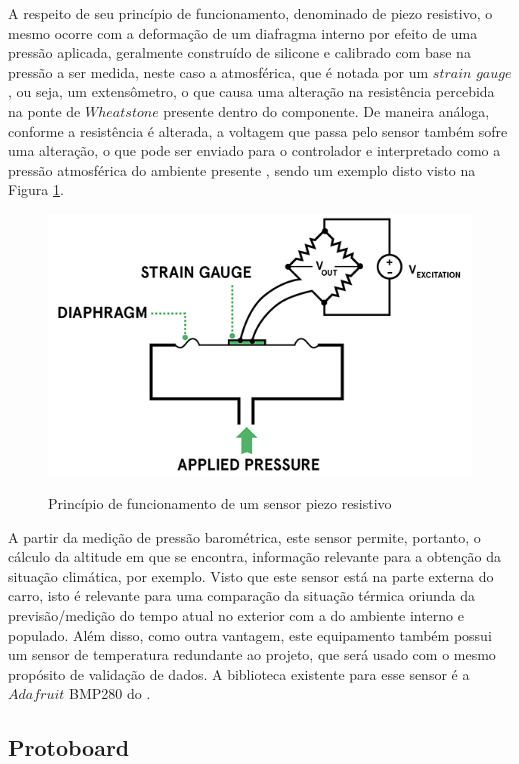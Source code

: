 \documentclass[acronym,symbols]{fei}
\begin{document}
A respeito de seu princípio de funcionamento, denominado de piezo resistivo, o mesmo ocorre com a deformação de um diafragma interno por efeito de uma pressão aplicada, geralmente construído de silicone e calibrado com base na pressão a ser medida, neste caso a atmosférica, que é notada por um $strain$ $gauge$, ou seja, um extensômetro, o que causa uma alteração na resistência percebida na ponte de $Wheatstone$ presente dentro do componente. De maneira análoga, conforme a resistência é alterada, a voltagem que passa pelo sensor também sofre uma alteração, o que pode ser enviado para o controlador e interpretado como a pressão atmosférica do ambiente presente \cite{piezo}, sendo um exemplo disto visto na Figura \ref{fig:piezoresist}.

\begin{figure}[!htb]
\centering
    \caption{Princípio de funcionamento de um sensor piezo resistivo}
    \includegraphics[width=0.8\linewidth]{Imagens/piezoresist.jpg}
    \label{fig:piezoresist}
\end{figure}

A partir da medição de pressão barométrica, este sensor permite, portanto, o cálculo da altitude em que se encontra, informação relevante para a obtenção da situação climática, por exemplo. Visto que este sensor está na parte externa do carro, isto é relevante para uma comparação da situação térmica oriunda da previsão/medição do tempo atual no exterior com a do ambiente interno e populado. Além disso, como outra vantagem, este equipamento também possui um sensor de temperatura redundante ao projeto, que será usado com o mesmo propósito de validação de dados. A biblioteca existente para esse sensor é a $Adafruit$ BMP280 do \textcite{Adafruit_BMP280}. 

\subsection{Protoboard}
\end{document}
